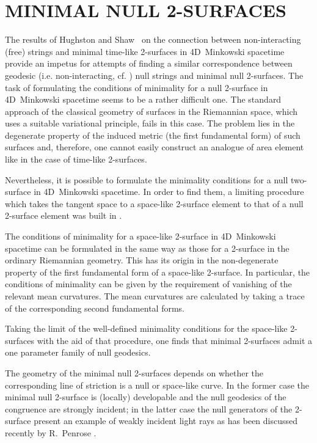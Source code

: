 \documentclass[a4paper,twocolumn,showkeys,showpacs,aps]{revtex4}
\begin{document}
\section{MINIMAL NULL 2-SURFACES}

The results of Hughston and Shaw~\cite{Hughston-Shaw} on the
connection between non-interacting (free) strings and minimal
time-like 2-surfaces in 4D~Minkowski spacetime provide an impetus
for attempts of finding a similar correspondence between geodesic
(i.e. non-interacting, cf. \cite{Ilienko2}) null strings and
minimal null 2-surfaces. The task of formulating the conditions of
minimality for a null 2-surface in 4D~Minkowski spacetime seems to
be a rather difficult one. The standard approach of the classical
geometry of surfaces in the Riemannian space, which uses a
suitable variational principle, fails in this case. The problem
lies in the degenerate property of the induced metric (the first
fundamental form) of such surfaces and, therefore, one cannot
easily construct an analogue of area element like in the case of
time-like 2-surfaces.

Nevertheless, it is possible to formulate the minimality
conditions for a null two-surface in 4D~Minkowski spacetime. In
order to find them, a limiting procedure which takes the tangent
space to a space-like 2-surface element to that of a null
2-surface element was built in \cite{Disser}.

The conditions of minimality for a space-like 2-surface in
4D~Minkowski spacetime can be formulated in the same way as those
for a 2-surface in the ordinary Riemannian geometry. This has its
origin in the non-degenerate property of the first fundamental
form of a space-like 2-surface. In particular, the conditions of
minimality can be given by the requirement of vanishing of the
relevant mean curvatures. The mean curvatures are calculated by
taking a trace of the corresponding second fundamental forms.

Taking the limit of the well-defined minimality conditions for the
space-like 2-surfaces with the aid of that procedure, one finds
that minimal 2-surfaces admit a one parameter family of null
geodesics.

The geometry of the minimal null 2-surfaces depends on whether the
corresponding line of striction is a null or space-like curve. In
the former case the minimal null 2-surface is (locally)
developable and the null geodesics of the congruence are strongly
incident; in the latter case the null generators of the 2-surface
present an example of weakly incident light rays as has been
discussed recently by R.~Penrose \cite{Penrose_97}.
\end{document}
